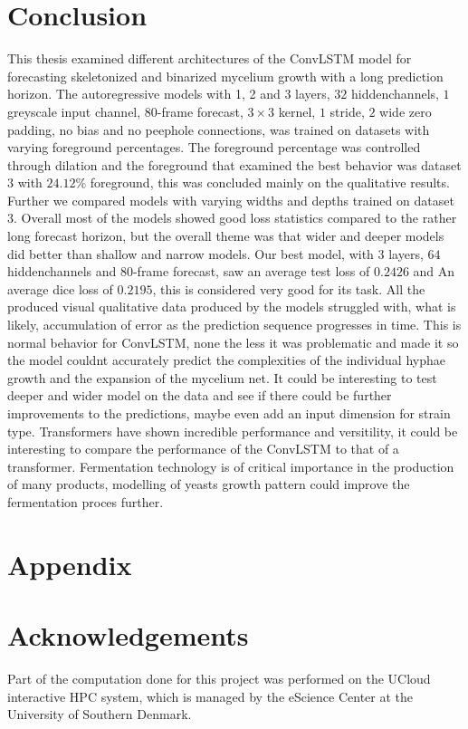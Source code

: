 \documentclass[a4paper,12pt]{article}
\begin{document}
\section{Conclusion}
This thesis examined different architectures of the ConvLSTM model for forecasting skeletonized and binarized mycelium growth with a long prediction horizon. The autoregressive models with 1, 2 and 3 layers, $32$ hiddenchannels, $1$ greyscale input channel, $80$-frame forecast, $3 \times 3$ kernel, $1$ stride, $2$ wide zero padding, no bias and no peephole connections, was trained on datasets with varying foreground percentages. The foreground percentage was controlled through dilation and the foreground that examined the best behavior was dataset $3$ with $24.12\%$ foreground, this was concluded mainly on the qualitative results.
Further we compared models with varying widths and depths trained on dataset $3$. Overall most of the models showed good loss statistics compared to the rather long forecast horizon, but the overall theme was that wider and deeper models did better than shallow and narrow models.
 Our best model, with $3$ layers, $64$ hiddenchannels and $80$-frame forecast, saw an average test loss of $0.2426$ and An average dice loss of $0.2195$, this is considered very good for its task. All the produced visual qualitative data produced by the models struggled with, what is likely, accumulation of error as the prediction sequence progresses in time. This is normal behavior for ConvLSTM, none the less it was problematic and made it so the model couldnt accurately predict the complexities of the individual hyphae growth and the expansion of the mycelium net.
 It could be interesting to test deeper and wider model on the data and see if there could be further improvements to the predictions, maybe even add an input dimension for strain type. Transformers have shown incredible performance and versitility, it could be interesting to compare the performance of the ConvLSTM to that of a transformer.
 Fermentation technology is of critical importance in the production of many products, modelling of yeasts growth pattern could improve the fermentation proces further.

\section{Appendix}



\section{Acknowledgements}
Part of the computation done for this project was performed on the UCloud interactive HPC system, which is managed by the eScience Center at the University of Southern Denmark.



\end{document}
